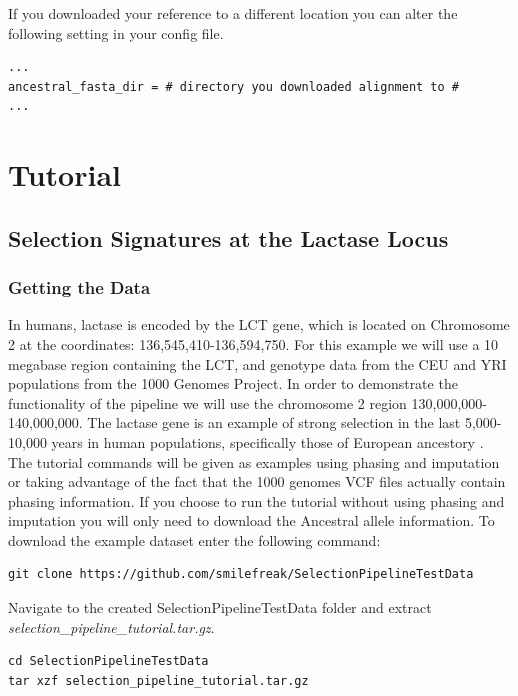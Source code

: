 \documentclass[a4paper,10pt]{article}
\begin{document}
\noindent
If you downloaded your reference to a different location you can alter the following setting in your config file.\\
\begin{verbatim}
...
ancestral_fasta_dir = # directory you downloaded alignment to #
...
\end{verbatim}

\section{Tutorial}
\subsection{Selection Signatures at the Lactase Locus}
\subsubsection{Getting the Data}
In humans, lactase is encoded by the LCT gene, which is located on
Chromosome 2 at the coordinates:
136,545,410-136,594,750. For this example we will use a 10
megabase region containing the LCT, and genotype data from the CEU and YRI
populations from the 1000 Genomes Project. In order to demonstrate the
functionality of the pipeline we will use the chromosome 2 region
130,000,000-140,000,000. The lactase gene is an example of strong selection in
the last 5,000-10,000 years in human populations, specifically
those of European ancestory \citep{lactase2004}. The tutorial commands will be given as examples using phasing and imputation or taking advantage of the fact that the 1000 genomes VCF files actually contain phasing information. If you choose to run the tutorial without using phasing and imputation you will only need to download the Ancestral allele information.
To download the example dataset enter the following command:

{\small
\begin{verbatim}
git clone https://github.com/smilefreak/SelectionPipelineTestData
\end{verbatim}
}

\noindent
Navigate to the created SelectionPipelineTestData folder and extract \emph{selection\_pipeline\_tutorial.tar.gz}. 

\begin{verbatim}
cd SelectionPipelineTestData
tar xzf selection_pipeline_tutorial.tar.gz
\end{verbatim}
\end{document}
